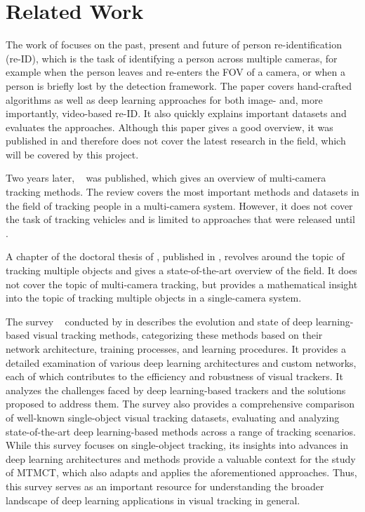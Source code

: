 \section{Related Work}\label{sec:related_work}
The work of \textcite{Zheng16c} focuses on the past, present and future of person re-identification (re-ID), which is the task of identifying a person across multiple cameras, for example when the person leaves and re-enters the FOV of a camera, or when a person is briefly lost by the detection framework. The paper covers hand-crafted algorithms as well as deep learning approaches for both image- and, more importantly, video-based re-ID. It also quickly explains important datasets and evaluates the approaches. Although this paper gives a good overview, it was published in \citeyear{Zheng16c} and therefore does not cover the latest research in the field, which will be covered by this project.

Two years later, ~\cite{Iguernaissi18} was published, which gives an overview of multi-camera tracking methods. The review covers the most important methods and datasets in the field of tracking people in a multi-camera system. However, it does not cover the task of tracking vehicles and is limited to approaches that were released until \citeyear{Iguernaissi18}.

A chapter of the doctoral thesis of \textcite[Chapter 5]{Tian19}, published in \citeyear{Tian19}, revolves around the topic of tracking multiple objects and gives a state-of-the-art overview of the field. It does not cover the topic of multi-camera tracking, but provides a mathematical insight into the topic of tracking multiple objects in a single-camera system.

The survey ~\cite{Zadeh21} conducted by \citeauthor{Zadeh21} in \citeyear{Zadeh21} describes the evolution and state of deep learning-based visual tracking methods, categorizing these methods based on their network architecture, training processes, and learning procedures. It provides a detailed examination of various deep learning architectures and custom networks, each of which contributes to the efficiency and robustness of visual trackers. It analyzes the challenges faced by deep learning-based trackers and the solutions proposed to address them. The survey also provides a comprehensive comparison of well-known single-object visual tracking datasets, evaluating and analyzing state-of-the-art deep learning-based methods across a range of tracking scenarios. While this survey focuses on single-object tracking, its insights into advances in deep learning architectures and methods provide a valuable context for the study of MTMCT, which also adapts and applies the aforementioned approaches. Thus, this survey serves as an important resource for understanding the broader landscape of deep learning applications in visual tracking in general.

